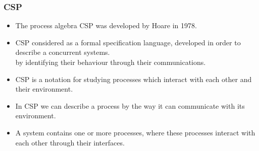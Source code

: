 \documentclass{beamer}
\begin{document}







\begin{frame}
\frametitle {CSP}
\begin{itemize}

\item The process algebra CSP was developed by Hoare in 1978.

\item CSP considered as a formal specification language, developed in order to describe a concurrent systems. \\
{\footnotesize
by identifying their behaviour through their communications.}

\item CSP is a notation for studying processes which interact with each other and their environment.

\item In CSP we can describe a process by the way it can communicate with its environment. 


\item A system contains one or more processes, where these processes interact with each other through their interfaces. 

\end{itemize}
\end{frame}






\end{document}
